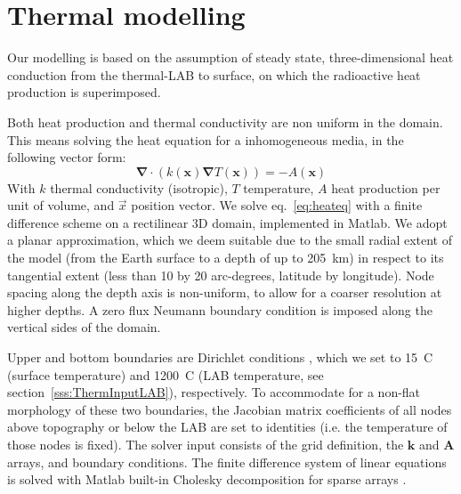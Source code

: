 \section{Thermal modelling}
\label{s:Appl:Therm}
Our modelling is based on the assumption of steady state, three-dimensional heat conduction from the thermal-LAB to surface, on which the radioactive heat production is superimposed.

Both heat production and thermal conductivity are non uniform in the domain.
This means solving the heat equation for a inhomogeneous media, in the following vector form:
\begin{equation}
\label{eq:heateq}
\mathbf{\nabla} \cdot ( k(\mathbf{x}) \mathbf{\nabla} T(\mathbf{x}) ) = - A(\mathbf{x})
\end{equation}
With $k$ thermal conductivity (isotropic), $T$ temperature, $A$ heat production per unit of volume, and $\vec{x}$ position vector.
We solve eq.~\ref{eq:heateq} with a finite difference scheme on a rectilinear 3D domain, implemented in Matlab.
We adopt a planar approximation, which we deem suitable due to the small radial extent of the model (from the Earth surface to a depth of up to 205~km) in respect to its tangential extent (less than 10 by 20 arc-degrees, latitude by longitude).
Node spacing along the depth axis is non-uniform, to allow for a coarser resolution at higher depths.
A zero flux Neumann boundary condition \parencite{smith1985} is imposed along the vertical sides of the domain.

Upper and bottom boundaries are Dirichlet conditions \parencite{smith1985}, which we set to 15~\textdegree C (surface temperature) and 1200~\textdegree C (LAB temperature, see section~\ref{sss:ThermInputLAB}), respectively.
To accommodate for a non-flat morphology of these two boundaries, the Jacobian matrix coefficients of all nodes above topography or below the LAB are set to identities (i.e. the temperature of those nodes is fixed).
The solver input consists of the grid definition, the $\mathbf{k}$ and $\mathbf{A}$ arrays, and boundary conditions.
The finite difference system of linear equations is solved with Matlab built-in Cholesky decomposition for sparse arrays \parencite{Davis2006}.

